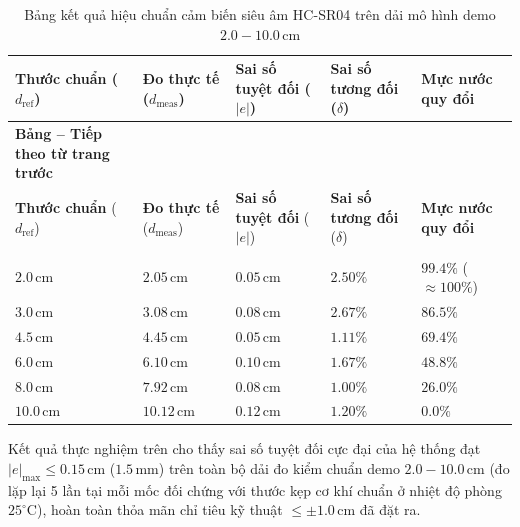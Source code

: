 \begingroup
\small
\renewcommand{\arraystretch}{1.2}
\begin{xltabular}{\textwidth}{|>{\centering\arraybackslash}p{2.8cm}|>{\centering\arraybackslash}p{2.8cm}|>{\centering\arraybackslash}p{2.6cm}|>{\centering\arraybackslash}p{2.6cm}|>{\centering\arraybackslash}X|}
\caption{Bảng kết quả hiệu chuẩn cảm biến siêu âm HC-SR04 trên dải mô hình demo $2.0 - 10.0\,\text{cm}$} \label{tab:calibration_results} \\
\hline
\textbf{Thước chuẩn} ($d_{\text{ref}}$) & \textbf{Đo thực tế} ($d_{\text{meas}}$) & \textbf{Sai số tuyệt đối} ($|e|$) & \textbf{Sai số tương đối} ($\delta$) & \textbf{Mực nước quy đổi} \\ \hline
\endfirsthead

%
{{\bfseries Bảng \thetable{} -- Tiếp theo từ trang trước}} \\
\hline
\textbf{Thước chuẩn} ($d_{\text{ref}}$) & \textbf{Đo thực tế} ($d_{\text{meas}}$) & \textbf{Sai số tuyệt đối} ($|e|$) & \textbf{Sai số tương đối} ($\delta$) & \textbf{Mực nước quy đổi} \\ \hline
\endhead

\hline {} \\ \hline
\endfoot

\hline
\endlastfoot

$2.0\,\text{cm}$ & $2.05\,\text{cm}$ & $0.05\,\text{cm}$ & $2.50\%$ & $99.4\%$ ($\approx 100\%$) \\ \hline
$3.0\,\text{cm}$ & $3.08\,\text{cm}$ & $0.08\,\text{cm}$ & $2.67\%$ & $86.5\%$ \\ \hline
$4.5\,\text{cm}$ & $4.45\,\text{cm}$ & $0.05\,\text{cm}$ & $1.11\%$ & $69.4\%$ \\ \hline
$6.0\,\text{cm}$ & $6.10\,\text{cm}$ & $0.10\,\text{cm}$ & $1.67\%$ & $48.8\%$ \\ \hline
$8.0\,\text{cm}$ & $7.92\,\text{cm}$ & $0.08\,\text{cm}$ & $1.00\%$ & $26.0\%$ \\ \hline
$10.0\,\text{cm}$ & $10.12\,\text{cm}$ & $0.12\,\text{cm}$ & $1.20\%$ & $0.0\%$ \\ \hline
\end{xltabular}
\endgroup
Kết quả thực nghiệm trên cho thấy sai số tuyệt đối cực đại của hệ thống đạt $|e|_{\max} \le 0.15\,\text{cm}$ ($1.5\,\text{mm}$) trên toàn bộ dải đo kiểm chuẩn demo $2.0 - 10.0\,\text{cm}$ (đo lặp lại 5 lần tại mỗi mốc đối chứng với thước kẹp cơ khí chuẩn ở nhiệt độ phòng $25^\circ\text{C}$), hoàn toàn thỏa mãn chỉ tiêu kỹ thuật $\le \pm 1.0\,\text{cm}$ đã đặt ra.

